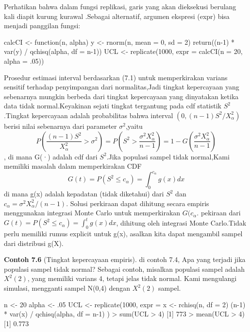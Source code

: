 \documentclass[a4paper,12pt]{article}
\theoremstyle{definition}
\begin{document}
Perhatikan bahwa dalam fungsi replikasi, garis yang akan dieksekusi berulang kali diapit kurung kurawal { }.Sebagai alternatif, argumen ekspresi (expr) bisa menjadi panggilan fungsi:
\begin{spverbatim}
calcCI <- function(n, alpha) {
     y <- rnorm(n, mean = 0, sd = 2)
     return((n-1) * var(y) / qchisq(alpha, df = n-1))
}
UCL <- replicate(1000, expr = calcCI(n = 20, alpha = .05))
\end{spverbatim}
Prosedur estimasi interval berdasarkan (7.1) untuk memperkirakan varians sensitif terhadap penyimpangan dari normalitas,Jadi tingkat kepercayaan yang sebenarnya mungkin berbeda dari tingkat kepercayaan yang dinyatakan ketika data tidak normal.Keyakinan sejati 
tingkat tergantung pada cdf statistik $S^{2}$.Tingkat kepercayaan adalah probabilitas bahwa interval $(0,(n-1)S^{2}/X_{\alpha}^{2})$ berisi nilai sebenarnya dari parameter $\sigma^{2}$,yaitu
\begin{equation}
    P(\frac{(n-1)S^{2}}{X_{\alpha}^{2}}>\sigma^{2})=P(S^{2}>\frac{\sigma^{2}X_{\alpha}^{2}}{n-1})=1-G(\frac{\sigma^{2}X_{\alpha}^{2}}{n-1})
\end{equation},
di mana G(·) adalah cdf dari $S^{2}$.Jika populasi sampel tidak normal,Kami memiliki masalah dalam memperkirakan CDF
\begin{equation}
    G(t)=P(S^{2}\leq c_{\alpha})=\int_{0}^{c_{\alpha}}g(x)dx
\end{equation}
di mana g(x) adalah kepadatan (tidak diketahui) dari $S^{2}$ dan $c_{\alpha}=\sigma^{2}X_{\alpha}^{2}/(n-1)$. Solusi perkiraan dapat dihitung secara empiris menggunakan integrasi Monte Carlo untuk memperkirakan $G(c_{\alpha}$. pekiraan dari $G(t)=P(S^{2}\leq c_{\alpha})=\int_{0}^{t}g(x)dx$, dihitung oleh integrasi Monte Carlo.Tidak perlu memiliki rumus explicit untuk g(x), asalkan kita dapat mengambil sampel dari distribusi g(X).

\textbf{Contoh 7.6} (Tingkat kepercayaan empiris). di contoh 7.4, Apa yang terjadi jika populasi sampel tidak normal? Sebagai contoh, misalkan populasi sampel adalah $X^{2}(2)$, yang memiliki varians 4, tetapi jelas tidak normal. Kami mengulangi simulasi, mengganti sampel N(0,4) dengan $X^{2}(2)$ sampel.

\begin{spverbatim}
n <- 20
alpha <- .05
UCL <- replicate(1000, expr = {
    x <- rchisq(n, df = 2)
    (n-1) * var(x) / qchisq(alpha, df = n-1)
    } )
> sum(UCL > 4)
[1] 773
> mean(UCL > 4)
[1] 0.773
\end{spverbatim}
\end{document}

